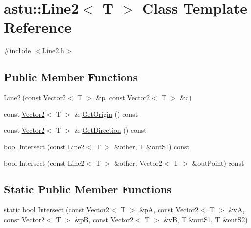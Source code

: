 \hypertarget{classastu_1_1Line2}{}\section{astu\+:\+:Line2$<$ T $>$ Class Template Reference}
\label{classastu_1_1Line2}


{\ttfamily \#include $<$Line2.\+h$>$}

\subsection*{Public Member Functions}
\begin{DoxyCompactItemize}
\item 
\hyperlink{classastu_1_1Line2_a72fd313c61c33e1560003636081fbccc}{Line2} (const \hyperlink{classastu_1_1Vector2}{Vector2}$<$ T $>$ \&p, const \hyperlink{classastu_1_1Vector2}{Vector2}$<$ T $>$ \&d)
\item 
const \hyperlink{classastu_1_1Vector2}{Vector2}$<$ T $>$ \& \hyperlink{classastu_1_1Line2_a73735aa5c8dbb21aa8e245e9170a9a47}{Get\+Origin} () const
\item 
const \hyperlink{classastu_1_1Vector2}{Vector2}$<$ T $>$ \& \hyperlink{classastu_1_1Line2_aa0ff02dd1daa9ef61fe0a45bf636ddff}{Get\+Direction} () const
\item 
bool \hyperlink{classastu_1_1Line2_a289cd1bf1ded7db8dc014f3ad4c22d86}{Intersect} (const \hyperlink{classastu_1_1Line2}{Line2}$<$ T $>$ \&other, T \&out\+S1) const
\item 
bool \hyperlink{classastu_1_1Line2_a1d16a1e232138e321cec8165baa0acad}{Intersect} (const \hyperlink{classastu_1_1Line2}{Line2}$<$ T $>$ \&other, \hyperlink{classastu_1_1Vector2}{Vector2}$<$ T $>$ \&out\+Point) const
\end{DoxyCompactItemize}
\subsection*{Static Public Member Functions}
\begin{DoxyCompactItemize}
\item 
static bool \hyperlink{classastu_1_1Line2_aab676ad8791895a35cb573df0d0b4912}{Intersect} (const \hyperlink{classastu_1_1Vector2}{Vector2}$<$ T $>$ \&pA, const \hyperlink{classastu_1_1Vector2}{Vector2}$<$ T $>$ \&vA, const \hyperlink{classastu_1_1Vector2}{Vector2}$<$ T $>$ \&pB, const \hyperlink{classastu_1_1Vector2}{Vector2}$<$ T $>$ \&vB, T \&out\+S1, T \&out\+S2)
\end{DoxyCompactItemize}


